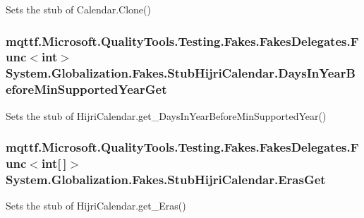 Sets the stub of Calendar.\-Clone()

\hypertarget{class_system_1_1_globalization_1_1_fakes_1_1_stub_hijri_calendar_aef1582dc2869bf53ee4a99720906e4b1}{
\subsubsection[{Days\-In\-Year\-Before\-Min\-Supported\-Year\-Get}]{\setlength{\rightskip}{0pt plus 5cm}mqttf.\-Microsoft.\-Quality\-Tools.\-Testing.\-Fakes.\-Fakes\-Delegates.\-Func$<$int$>$ System.\-Globalization.\-Fakes.\-Stub\-Hijri\-Calendar.\-Days\-In\-Year\-Before\-Min\-Supported\-Year\-Get}}\label{class_system_1_1_globalization_1_1_fakes_1_1_stub_hijri_calendar_aef1582dc2869bf53ee4a99720906e4b1}


Sets the stub of Hijri\-Calendar.\-get\-\_\-\-Days\-In\-Year\-Before\-Min\-Supported\-Year()

\hypertarget{class_system_1_1_globalization_1_1_fakes_1_1_stub_hijri_calendar_a614f352e808a3078de5d40e933e22e28}{
\subsubsection[{Eras\-Get}]{\setlength{\rightskip}{0pt plus 5cm}mqttf.\-Microsoft.\-Quality\-Tools.\-Testing.\-Fakes.\-Fakes\-Delegates.\-Func$<$int\mbox{[}$\,$\mbox{]}$>$ System.\-Globalization.\-Fakes.\-Stub\-Hijri\-Calendar.\-Eras\-Get}}\label{class_system_1_1_globalization_1_1_fakes_1_1_stub_hijri_calendar_a614f352e808a3078de5d40e933e22e28}


Sets the stub of Hijri\-Calendar.\-get\-\_\-\-Eras()

